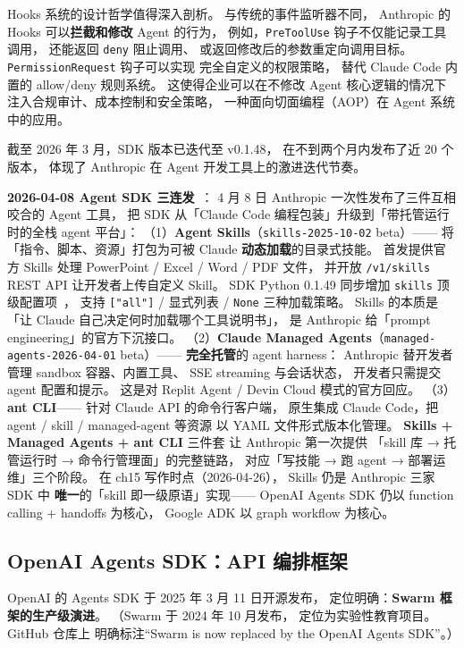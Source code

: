 Hooks 系统的设计哲学值得深入剖析。
与传统的事件监听器不同，
Anthropic 的 Hooks 可以\textbf{拦截和修改} Agent 的行为，
例如，\texttt{PreToolUse} 钩子不仅能记录工具调用，
还能返回 \texttt{deny} 阻止调用、
或返回修改后的参数重定向调用目标。
\texttt{PermissionRequest} 钩子可以实现
完全自定义的权限策略，
替代 Claude Code 内置的 allow/deny 规则系统。
这使得企业可以在不修改 Agent 核心逻辑的情况下
注入合规审计、成本控制和安全策略，
一种面向切面编程（AOP）在 Agent 系统中的应用。

截至 2026 年 3 月，SDK 版本已迭代至 v0.1.48，
在不到两个月内发布了近 20 个版本，
体现了 Anthropic 在 Agent 开发工具上的激进迭代节奏。

\textbf{2026-04-08 Agent SDK 三连发}~\cite{anthropicapril8}：
4 月 8 日 Anthropic 一次性发布了三件互相咬合的 Agent 工具，
把 SDK 从「Claude Code 编程包装」升级到「带托管运行时的全栈 agent 平台」：
（1）\textbf{Agent Skills}（\texttt{skills-2025-10-02} beta）——
将「指令、脚本、资源」打包为可被 Claude
\textbf{动态加载}的目录式技能。
首发提供官方 Skills 处理 PowerPoint / Excel / Word / PDF 文件，
并开放 \texttt{/v1/skills} REST API
让开发者上传自定义 Skill。
SDK Python 0.1.49 同步增加 \texttt{skills} 顶级配置项~\cite{claudeagentsdkskills}，
支持 \texttt{["all"]} / 显式列表 / \texttt{None} 三种加载策略。
Skills 的本质是「让 Claude 自己决定何时加载哪个工具说明书」，
是 Anthropic 给「prompt engineering」的官方下沉接口。
（2）\textbf{Claude Managed Agents}（\texttt{managed-agents-2026-04-01} beta）——
\textbf{完全托管}的 agent harness：
Anthropic 替开发者管理 sandbox 容器、内置工具、
SSE streaming 与会话状态，
开发者只需提交 agent 配置和提示。
这是对 Replit Agent / Devin Cloud 模式的官方回应。
（3）\textbf{ant CLI}——
针对 Claude API 的命令行客户端，
原生集成 Claude Code，把
agent / skill / managed-agent 等资源
以 YAML 文件形式版本化管理。
\textbf{Skills + Managed Agents + ant CLI} 三件套
让 Anthropic 第一次提供
「skill 库 → 托管运行时 → 命令行管理面」的完整链路，
对应「写技能 → 跑 agent → 部署运维」三个阶段。
在 ch15 写作时点（2026-04-26），
Skills 仍是 Anthropic 三家 SDK 中
\textbf{唯一}的「skill 即一级原语」实现——
OpenAI Agents SDK 仍以 function calling + handoffs 为核心，
Google ADK 以 graph workflow 为核心。

\subsection{OpenAI Agents SDK：API 编排框架}

OpenAI 的 Agents SDK 于 2025 年 3 月 11 日开源发布，
定位明确：\textbf{Swarm 框架的生产级演进}。
（Swarm 于 2024 年 10 月发布，
定位为实验性教育项目。GitHub 仓库上
明确标注“Swarm is now replaced by the OpenAI Agents SDK”。）

